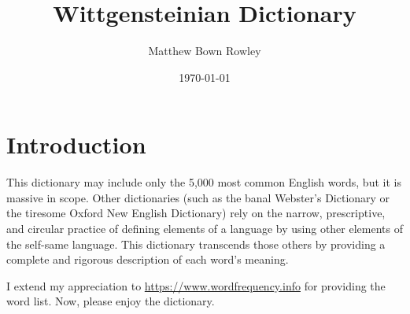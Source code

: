 \documentclass[12pt, letterpaper]{memoir}
\title{Wittgensteinian Dictionary}
\author{Matthew Bown Rowley}
\date{\today}
\begin{document}
\maketitle
\frontmatter
\chapter*{Introduction}
This dictionary may include only the 5,000 most common English words, but it
is massive in scope. Other dictionaries (such as the banal Webster's Dictionary
or the tiresome Oxford New English Dictionary) rely on the narrow, prescriptive,
and circular practice of defining elements of a language by using other
elements of the self-same language. This dictionary transcends those others by
providing a complete and rigorous description of each word's meaning.

I extend my appreciation to \hyperref[https://www.wordfrequency.info]{https://www.wordfrequency.info}
 for providing the word list. Now, please enjoy the dictionary.

\mainmatter
\end{document}

